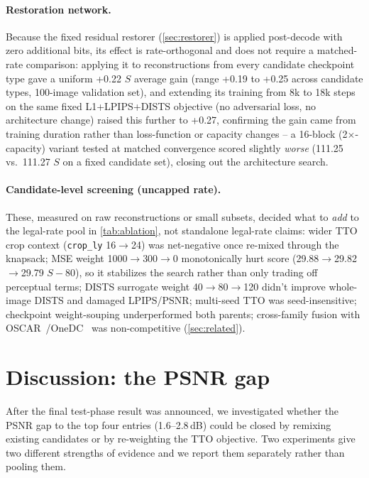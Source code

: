 \documentclass[runningheads]{llncs}
\begin{document}
\paragraph{Restoration network.} Because the fixed residual restorer (\cref{sec:restorer}) is applied post-decode with zero additional bits, its effect is rate-orthogonal and does not require a matched-rate comparison: applying it to reconstructions from every candidate checkpoint type gave a uniform +0.22 $S$ average gain (range +0.19 to +0.25 across candidate types, 100-image validation set), and extending its training from 8k to 18k steps on the same fixed L1+LPIPS+DISTS objective (no adversarial loss, no architecture change) raised this further to +0.27, confirming the gain came from training duration rather than loss-function or capacity changes -- a 16-block (2$\times$-capacity) variant tested at matched convergence scored slightly \emph{worse} (111.25 vs.\ 111.27 $S$ on a fixed candidate set), closing out the architecture search.

\paragraph{Candidate-level screening (uncapped rate).} These, measured on raw reconstructions or small subsets, decided what to \emph{add} to the legal-rate pool in \cref{tab:ablation}, not standalone legal-rate claims: wider TTO crop context (\texttt{crop\_ly} 16$\to$24) was net-negative once re-mixed through the knapsack; MSE weight 1000$\to$300$\to$0 monotonically hurt score (29.88$\to$29.82$\to$29.79 $S{-}80$), so it stabilizes the search rather than only trading off perceptual terms; DISTS surrogate weight 40$\to$80$\to$120 didn't improve whole-image DISTS and damaged LPIPS/PSNR; multi-seed TTO was seed-insensitive; checkpoint weight-souping underperformed both parents; cross-family fusion with OSCAR~\cite{guo2025oscar}/OneDC~\cite{xue2025onedc} was non-competitive (\cref{sec:related}).

\section{Discussion: the PSNR gap}
\label{sec:discussion}
After the final test-phase result was announced, we investigated whether the PSNR gap to the top four entries (1.6--2.8\,dB) could be closed by remixing existing candidates or by re-weighting the TTO objective. Two experiments give two different strengths of evidence and we report them separately rather than pooling them.
\end{document}
